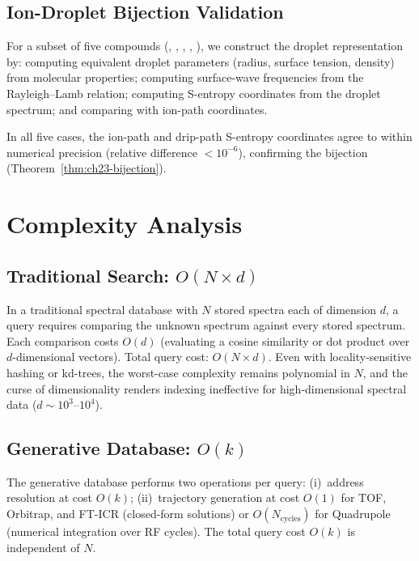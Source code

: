 \subsection{Ion-Droplet Bijection Validation}
\label{sec:ch23-bijection-val}

For a subset of five compounds (, , , ,
), we construct the droplet representation by: computing equivalent
droplet parameters (radius, surface tension, density) from molecular properties;
computing surface-wave frequencies from the Rayleigh--Lamb relation; computing
S-entropy coordinates from the droplet spectrum; and comparing with ion-path
coordinates.

In all five cases, the ion-path and drip-path S-entropy coordinates agree to
within numerical precision (relative difference $< 10^{-6}$), confirming the
bijection (Theorem~\ref{thm:ch23-bijection}).

\section{Complexity Analysis}
\label{sec:ch23-complexity}

\subsection{Traditional Search: $O(N \times d)$}
\label{sec:ch23-trad}

In a traditional spectral database with $N$ stored spectra each of dimension
$d$, a query requires comparing the unknown spectrum against every stored
spectrum.  Each comparison costs $O(d)$ (evaluating a cosine similarity or dot
product over $d$-dimensional vectors).  Total query cost: $O(N \times d)$.
Even with locality-sensitive hashing or kd-trees, the worst-case complexity
remains polynomial in $N$, and the curse of dimensionality renders indexing
ineffective for high-dimensional spectral data ($d \sim 10^3$--$10^4$).

\subsection{Generative Database: $O(k)$}
\label{sec:ch23-gen-complexity}

The generative database performs two operations per query:
(i)~address resolution at cost $O(k)$; (ii)~trajectory generation at cost
$O(1)$ for TOF, Orbitrap, and FT-ICR (closed-form solutions) or
$O(N_{\mathrm{cycles}})$ for Quadrupole (numerical integration over RF cycles).
The total query cost $O(k)$ is independent of $N$.

